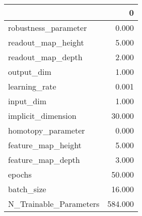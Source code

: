\begin{tabular}{lr}
\toprule
{} &        0 \\
\midrule
robustness\_parameter   &    0.000 \\
readout\_map\_height     &    5.000 \\
readout\_map\_depth      &    2.000 \\
output\_dim             &    1.000 \\
learning\_rate          &    0.001 \\
input\_dim              &    1.000 \\
implicit\_dimension     &   30.000 \\
homotopy\_parameter     &    0.000 \\
feature\_map\_height     &    5.000 \\
feature\_map\_depth      &    3.000 \\
epochs                 &   50.000 \\
batch\_size             &   16.000 \\
N\_Trainable\_Parameters &  584.000 \\
\bottomrule
\end{tabular}
